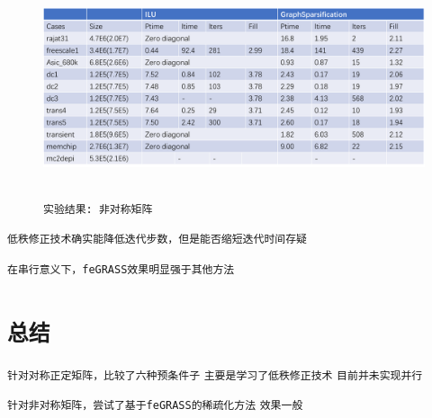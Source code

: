 \documentclass[11pt, a4paper]{article}
\theoremstyle{plain}
\theoremstyle{plain}
\theoremstyle{plain}
\theoremstyle{definition}
\theoremstyle{remark}
\theoremstyle{definition}
\newcommand{\T}[1]{\texttt{#1}}
\begin{document}
\begin{figure}[H]
	\caption{\T{实验结果: 非对称矩阵}}
	\centering
	\includegraphics[width=350pt,height=180pt]{normal.png}
\end{figure}

\T{低秩修正技术确实能降低迭代步数，但是能否缩短迭代时间存疑}

\T{在串行意义下，feGRASS效果明显强于其他方法}



\section*{\T{总结}}
\T{针对对称正定矩阵，比较了六种预条件子}
\T{主要是学习了低秩修正技术}
\T{目前并未实现并行}

\T{针对非对称矩阵，尝试了基于feGRASS的稀疏化方法}
\T{效果一般}


\renewcommand{\refname}{\T{参考文献}}


\end{document}
